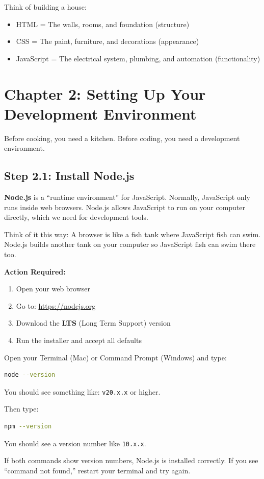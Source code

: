 \documentclass[12pt,a4paper]{article}
\begin{document}
Think of building a house:
\begin{itemize}
    \item HTML = The walls, rooms, and foundation (structure)
    \item CSS = The paint, furniture, and decorations (appearance)
    \item JavaScript = The electrical system, plumbing, and automation (functionality)
\end{itemize}

\section{Chapter 2: Setting Up Your Development Environment}

Before cooking, you need a kitchen. Before coding, you need a development environment.

\subsection{Step 2.1: Install Node.js}

\begin{concept}
\textbf{Node.js} is a ``runtime environment'' for JavaScript. Normally, JavaScript only runs inside web browsers. Node.js allows JavaScript to run on your computer directly, which we need for development tools.

Think of it this way: A browser is like a fish tank where JavaScript fish can swim. Node.js builds another tank on your computer so JavaScript fish can swim there too.
\end{concept}

\textbf{Action Required:}
\begin{enumerate}
    \item Open your web browser
    \item Go to: \url{https://nodejs.org}
    \item Download the \textbf{LTS} (Long Term Support) version
    \item Run the installer and accept all defaults
\end{enumerate}

\begin{checkpoint}
Open your Terminal (Mac) or Command Prompt (Windows) and type:
\begin{lstlisting}[language=bash]
node --version
\end{lstlisting}
You should see something like: \texttt{v20.x.x} or higher.

Then type:
\begin{lstlisting}[language=bash]
npm --version
\end{lstlisting}
You should see a version number like \texttt{10.x.x}.

If both commands show version numbers, Node.js is installed correctly. If you see ``command not found,'' restart your terminal and try again.
\end{checkpoint}
\end{document}

